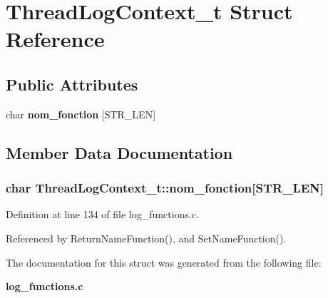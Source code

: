\section{Thread\-Log\-Context\_\-t Struct Reference}
\label{structThreadLogContext__t}
\subsection*{Public Attributes}
\begin{CompactItemize}
\item 
char {\bf nom\_\-fonction} [STR\_\-LEN]
\end{CompactItemize}


\subsection{Member Data Documentation}
\subsubsection{\setlength{\rightskip}{0pt plus 5cm}char {\bf Thread\-Log\-Context\_\-t::nom\_\-fonction}[STR\_\-LEN]}\label{structThreadLogContext__t_o0}




Definition at line 134 of file log\_\-functions.c.

Referenced by Return\-Name\-Function(), and Set\-Name\-Function().

The documentation for this struct was generated from the following file:\begin{CompactItemize}
\item 
{\bf log\_\-functions.c}\end{CompactItemize}

